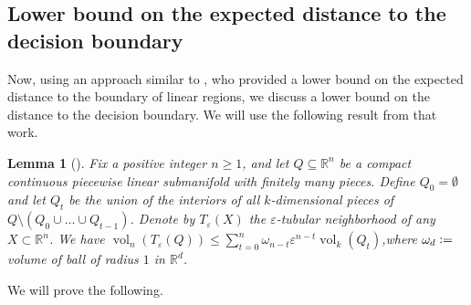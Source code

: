 \documentclass{article}
\newtheorem{lemma}[theorem]{Lemma}
\theoremstyle{definition}
\newcommand{\defeq}{\vcentcolon=}
\newcommand{\vol}{\operatorname{vol}}
\begin{document}
\theoremdecisionboundary*

\subsection{Lower bound on the expected distance to the decision boundary}

Now, using an approach similar to \citet[Corollary~5]{pmlr-v97-hanin19a}, who provided a lower bound on the expected distance to the boundary of linear regions, we discuss a lower bound on the distance to the decision boundary. 
We will use the following result from that work. 

\begin{lemma}[{\citealt[Lemma 12]{pmlr-v97-hanin19a}}]
\label{lem:hr_tube}
    Fix a positive integer $n \geq 1$, and let $Q \subseteq \mathbb{R}^n$ be a compact continuous piecewise linear submanifold
    with finitely many pieces. Define $Q_0 = \emptyset$ and let $Q_t$ be the union of the interiors of all $k$-dimensional pieces of $Q \setminus (Q_0 \cup \dots \cup Q_{t - 1})$. Denote by $T_{\varepsilon}(X)$ the $\varepsilon$-tubular neighborhood of any $X \subset \mathbb{R}^n$. We have $\vol_n (T_{\varepsilon}(Q)) \leq \sum_{t=0}^n \omega_{n - t} \varepsilon^{n - t} \vol_k (Q_t)$,where $\omega_d \defeq $ volume of ball of radius $1$ in $\mathbb{R}^d$.
\end{lemma}

We will prove the following. 
\end{document}

